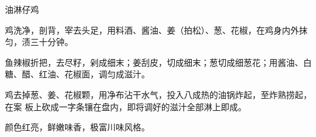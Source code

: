 \begin{recipe}{油淋仔鸡}

\ingredients


\preparation

\step 鸡洗净，剖背，宰去头足，用料酒、酱油、姜（拍松）、葱、花椒，在鸡身内外抹
匀，渍三十分钟。

\step 鱼辣椒折把，去尽籽，剁成细末；姜刮皮，切成细末；葱切成细葱花；用酱油、白
糖、醋、红油、花椒面，调匀成滋汁。

鸡去掉葱、姜、花椒颗，用净布沾干水气，投入八成热的油锅炸起，至炸熟捞起，在案
板上砍成一字条镶在盘内，即将调好的滋汁全部淋上即成。

\features

颜色红亮，鲜嫩味香，极富川味风格。

\end{recipe}

